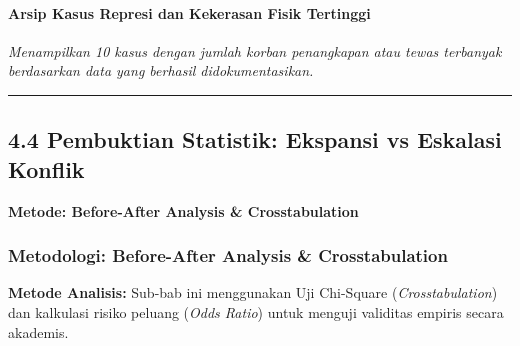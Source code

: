 \documentclass[
]{article}
\begin{document}
\paragraph{Arsip Kasus Represi dan Kekerasan Fisik
Tertinggi}\label{arsip-kasus-represi-dan-kekerasan-fisik-tertinggi}

\emph{Menampilkan 10 kasus dengan jumlah korban penangkapan atau tewas
terbanyak berdasarkan data yang berhasil didokumentasikan.}

\begin{center}\rule{0.5\linewidth}{0.5pt}\end{center}

\subsection{4.4 Pembuktian Statistik: Ekspansi vs Eskalasi
Konflik}\label{pembuktian-statistik-ekspansi-vs-eskalasi-konflik}

\textbf{Metode: Before-After Analysis \& Crosstabulation}

\subsubsection{Metodologi: Before-After Analysis \&
Crosstabulation}\label{metodologi-before-after-analysis-crosstabulation}

\textbf{Metode Analisis:} Sub-bab ini menggunakan Uji Chi-Square
(\emph{Crosstabulation}) dan kalkulasi risiko peluang (\emph{Odds
Ratio}) untuk menguji validitas empiris secara akademis.
\end{document}
